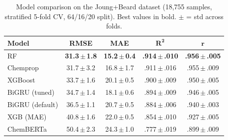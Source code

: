 \begin{table}[htbp]
\centering
\caption{Model comparison on the Joung+Beard dataset (18,755 samples, stratified 5-fold CV, 64/16/20 split). Best values in bold. $\pm$ = std across folds.}
\label{tab:model_comparison}
\footnotesize
\setlength{\tabcolsep}{3pt}
\begin{tabular}{@{}lcccc@{}}
\toprule
\textbf{Model} & \textbf{RMSE} & \textbf{MAE} & $\boldsymbol{R^2}$ & $\boldsymbol{r}$ \\
\midrule
RF              & \textbf{31.3\,{\scriptsize$\pm$\,1.8}} & \textbf{15.2\,{\scriptsize$\pm$\,0.4}} & \textbf{.914\,{\scriptsize$\pm$\,.010}} & \textbf{.956\,{\scriptsize$\pm$\,.005}} \\
Chemprop        & 31.7\,{\scriptsize$\pm$\,3.2}          & 16.8\,{\scriptsize$\pm$\,1.7}          & .911\,{\scriptsize$\pm$\,.016}          & .955\,{\scriptsize$\pm$\,.009} \\
XGBoost         & 33.7\,{\scriptsize$\pm$\,1.6}          & 20.1\,{\scriptsize$\pm$\,0.5}          & .900\,{\scriptsize$\pm$\,.009}          & .950\,{\scriptsize$\pm$\,.005} \\
BiGRU (tuned)   & 34.7\,{\scriptsize$\pm$\,1.4}          & 18.1\,{\scriptsize$\pm$\,0.6}          & .894\,{\scriptsize$\pm$\,.009}          & .946\,{\scriptsize$\pm$\,.005} \\
BiGRU (default) & 36.5\,{\scriptsize$\pm$\,1.1}          & 20.7\,{\scriptsize$\pm$\,0.5}          & .884\,{\scriptsize$\pm$\,.006}          & .940\,{\scriptsize$\pm$\,.003} \\
XGB (MAE)       & 40.8\,{\scriptsize$\pm$\,1.6}          & 22.0\,{\scriptsize$\pm$\,0.5}          & .854\,{\scriptsize$\pm$\,.010}          & .927\,{\scriptsize$\pm$\,.005} \\
ChemBERTa       & 50.4\,{\scriptsize$\pm$\,2.3}          & 24.3\,{\scriptsize$\pm$\,1.0}          & .777\,{\scriptsize$\pm$\,.019}          & .899\,{\scriptsize$\pm$\,.009} \\
\bottomrule
\end{tabular}
\end{table}

